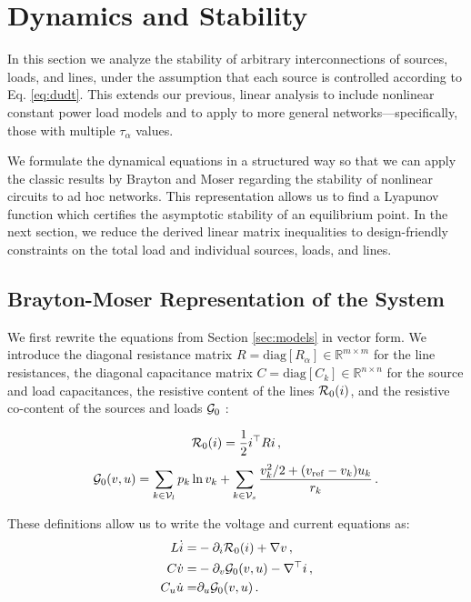 \documentclass[letterpaper, 10 pt, conference]{ieeeconf}
\begin{document}
\section{Dynamics and Stability}\label{sec:dynamics}

In this section we analyze the stability of arbitrary interconnections of sources, loads, and lines, under the assumption that each source is controlled according to Eq. \eqref{eq:dudt}. This extends our previous, linear analysis \cite{compel} to include nonlinear constant power load models and to apply to more general networks---specifically, those with multiple $\tau_\alpha$ values.

We formulate the dynamical equations in a structured way so that we can apply the classic results by Brayton and Moser regarding the stability of nonlinear circuits \cite{Brayton:1964gr} to ad hoc networks. This representation allows us to find a Lyapunov function which certifies the asymptotic stability of an equilibrium point. In the next section, we reduce the derived linear matrix inequalities to design-friendly constraints on the total load and individual sources, loads, and lines.

\subsection{Brayton-Moser Representation of the System}

We first rewrite the equations from Section \ref{sec:models} in vector form. We introduce the diagonal resistance matrix $R = \mathrm{diag}[R_\alpha] \in \mathbb{R}^{m\times m}$ for the line resistances, the diagonal capacitance matrix $C = \mathrm{diag}[C_k] \in \mathbb{R}^{n\times n}$ for the source and load capacitances, the resistive content of the lines ${\cal R}_0(i)$, and the resistive co-content of the sources and loads ${\cal G}_0$ \cite{Jeltsema:2009jd}:

\begin{equation}
	{\cal R}_0(i) = \frac{1}{2}i^\top R i\,,
\end{equation}
\begin{equation}
	{\cal G}_0(v,u) =   \sum_{k\in {\cal V}_l} p_k \ln{v_k} + \sum_{k\in{\cal V}_s} \frac{v_k^2 /2 + (v_{\mathrm{ref}}-v_k) u_k}{r_k}\,.
\end{equation}

These definitions allow us to write the voltage and current equations as:
\begin{subequations}\label{eq:main}
\begin{align}
     L \dot{i}  = &
     - \partial_i {\cal R}_0(i) + \nabla v\,, \label{didt} \\
      C \dot{v} = & -\partial_v {\cal G}_0(v,u) - \nabla^\top i\,, \\
      C_u \dot{u} = &  \partial_u {\cal G}_0(v,u)\,.
\end{align}
\end{subequations}
\end{document}
